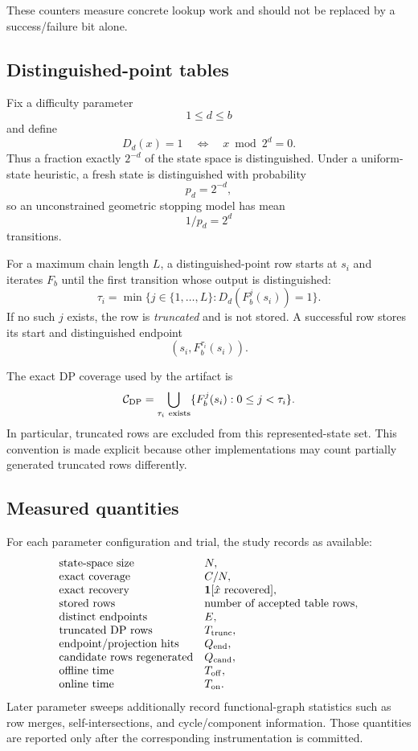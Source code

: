 These counters measure concrete lookup work and should not be replaced by a
success/failure bit alone.

\subsection{Distinguished-point tables}

Fix a difficulty parameter
\[
    1\leq d\leq b
\]
and define
\[
    D_d(x)=1
    \quad\Longleftrightarrow\quad
    x\bmod 2^d=0.
\]
Thus a fraction exactly $2^{-d}$ of the state space is distinguished.  Under
a uniform-state heuristic, a fresh state is distinguished with probability
\[
    p_d=2^{-d},
\]
so an unconstrained geometric stopping model has mean
\[
    1/p_d=2^d
\]
transitions.

For a maximum chain length $L$, a distinguished-point row starts at $s_i$ and
iterates $F_b$ until the first transition whose output is distinguished:
\[
    \tau_i
      =
      \min\{j\in\{1,\ldots,L\}:D_d(F_b^j(s_i))=1\}.
\]
If no such $j$ exists, the row is \emph{truncated} and is not stored.  A
successful row stores its start and distinguished endpoint
\[
    (s_i,F_b^{\tau_i}(s_i)).
\]

The exact DP coverage used by the artifact is
\[
    \mathcal C_{\rm DP}
      =
      \bigcup_{\tau_i\ {\rm exists}}
      \{F_b^j(s_i):0\leq j<\tau_i\}.
\]
In particular, truncated rows are excluded from this represented-state set.
This convention is made explicit because other implementations may count
partially generated truncated rows differently.

\subsection{Measured quantities}

For each parameter configuration and trial, the study records as available:
\[
\begin{array}{ll}
\text{state-space size} & N,\\
\text{exact coverage} & C/N,\\
\text{exact recovery} & \mathbf 1[\hat x\ {\rm recovered}],\\
\text{stored rows} & \text{number of accepted table rows},\\
\text{distinct endpoints} & E,\\
\text{truncated DP rows} & T_{\rm trunc},\\
\text{endpoint/projection hits} & Q_{\rm end},\\
\text{candidate rows regenerated} & Q_{\rm cand},\\
\text{offline time} & T_{\rm off},\\
\text{online time} & T_{\rm on}.
\end{array}
\]
Later parameter sweeps additionally record functional-graph statistics such as
row merges, self-intersections, and cycle/component information.  Those
quantities are reported only after the corresponding instrumentation is
committed.
